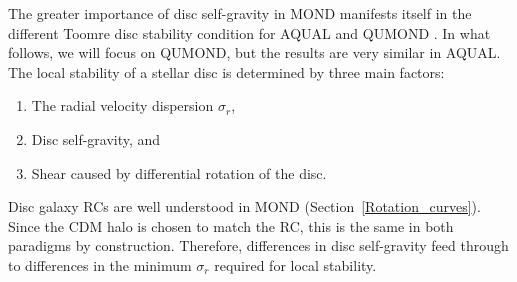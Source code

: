 \documentclass[fleqn,usenatbib,useAMS]{mnras} %
\begin{document}
The greater importance of disc self-gravity in MOND manifests itself in the different Toomre disc stability condition \citep{Toomre_1964} for AQUAL \citep{Milgrom_1989} and QUMOND \citep{Banik_2018_Toomre}. In what follows, we will focus on QUMOND, but the results are very similar in AQUAL. The local stability of a stellar disc is determined by three main factors:
\begin{enumerate}
	\item The radial velocity dispersion $\sigma_r$,
	\item Disc self-gravity, and
	\item Shear caused by differential rotation of the disc.
\end{enumerate}
Disc galaxy RCs are well understood in MOND (Section~\ref{Rotation_curves}). Since the CDM halo is chosen to match the RC, this is the same in both paradigms by construction. Therefore, differences in disc self-gravity feed through to differences in the minimum $\sigma_r$ required for local stability.
\end{document}
